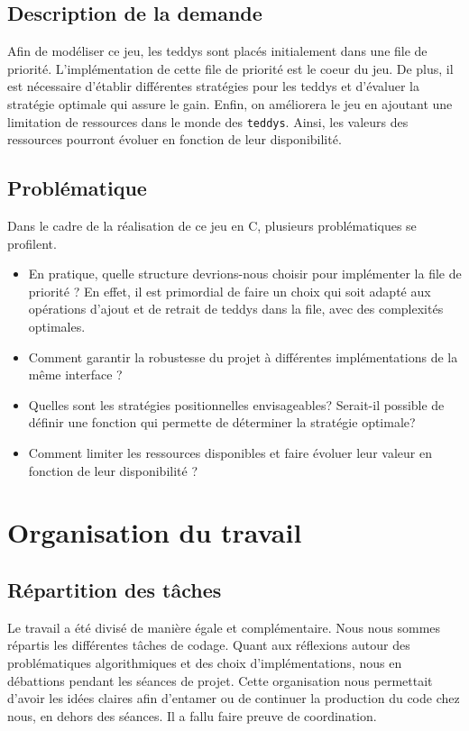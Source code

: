 \documentclass[12pt]{article}
\begin{document}
        \subsection{Description de la demande}
Afin de modéliser ce jeu, les teddys sont placés initialement dans une file de priorité. L'implémentation de cette file de priorité est le coeur du jeu. De plus, il est nécessaire d'établir différentes stratégies pour les teddys et d'évaluer la stratégie optimale qui assure le gain. Enfin, on améliorera le jeu en ajoutant une limitation de ressources dans le monde des \texttt{teddys}. Ainsi, les valeurs des ressources pourront évoluer en fonction de leur disponibilité.
\subsection{Problématique}
Dans le cadre de la réalisation de ce jeu en C, plusieurs problématiques se profilent.
\begin{itemize}
\item En pratique, quelle structure devrions-nous choisir pour implémenter la file de priorité ? En effet, il est primordial de faire un choix qui soit adapté aux opérations d'ajout et de retrait de teddys dans la file, avec des complexités optimales.
\item Comment garantir la robustesse du projet à différentes implémentations de la même interface ?
\item Quelles sont les stratégies positionnelles envisageables? Serait-il possible de définir une fonction qui permette de déterminer la stratégie optimale?
\item Comment limiter les ressources disponibles et faire évoluer leur valeur en fonction de leur disponibilité ?
\end{itemize}


\section{Organisation du travail}

        \subsection{Répartition des tâches}
        Le travail a été divisé de manière égale et complémentaire. Nous nous sommes répartis les différentes tâches de codage. Quant aux réflexions autour des problématiques algorithmiques et des choix d'implémentations, nous en débattions pendant les séances de projet. Cette organisation nous permettait d'avoir les idées claires afin d'entamer ou de continuer la production du code chez nous, en dehors des séances. Il a fallu faire preuve de coordination. 
\end{document}
